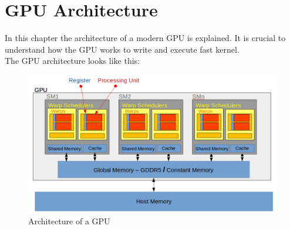 \chapter{GPU Architecture}

In this chapter the architecture of a modern GPU is explained. It is crucial to understand how the GPU works to write and execute fast kernel.\\

The GPU architecture looks like this:\\
\begin{figure}[H]
	\centering
	\includegraphics[width=\textwidth]{imgs/gpuArch.png}
	\caption[Figure]{Architecture of a GPU}
	\label{fig:gpuArch}
\end{figure}

\cite[Parallel Computing Book]{ParaComputation}

